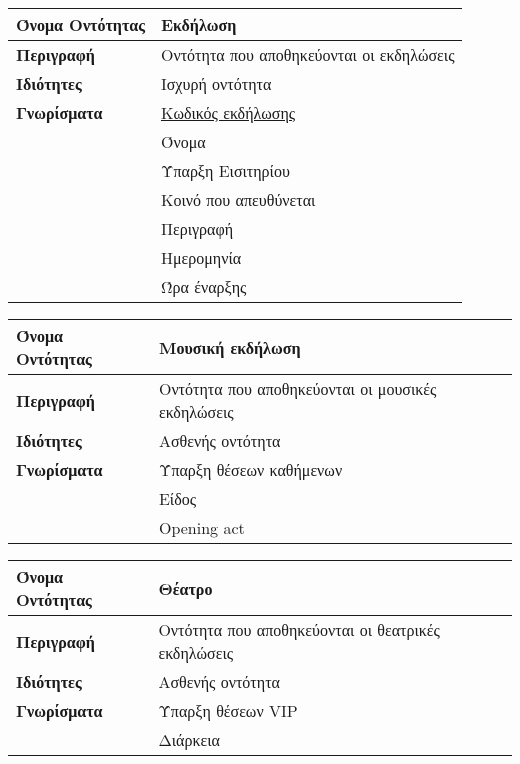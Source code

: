 \begin{center}
\begin{tabular}[]{|p{4cm}|p{10cm}|}
\hline
\textbf{Όνομα Οντότητας}   &  Εκδήλωση  \\ \hline 
\textbf{Περιγραφή}         &  Οντότητα που αποθηκεύονται οι εκδηλώσεις \\ \hline 
\textbf{Ιδιότητες}         &  Ισχυρή οντότητα \\  \hline               
\textbf{Γνωρίσματα}        &  \underline{Κωδικός εκδήλωσης} \\
                           &  Όνομα \\
            ~              &  Ύπαρξη Εισιτηρίου \\
             ~             &  Κοινό που απευθύνεται \\
              ~            &  Περιγραφή \\
                           &  Ημερομηνία \\
                           &  Ώρα έναρξης\\
 \hline
\end{tabular}
\vspace{0.3 cm}


\begin{tabular}[]{|p{4cm}|p{10cm}|}
 \hline
\textbf{Όνομα Οντότητας}   &  Μουσική εκδήλωση  \\ \hline 
\textbf{Περιγραφή}         &  Οντότητα που αποθηκεύονται οι μουσικές εκδηλώσεις \\ \hline 
\textbf{Ιδιότητες}         &  Ασθενής οντότητα \\  \hline               
\textbf{Γνωρίσματα}        &  Ύπαρξη θέσεων καθήμενων \\
                           &  Είδος \\
                           &  Opening act \\
 \hline
\end{tabular}
\vspace{0.3 cm}

\begin{tabular}[]{|p{4cm}|p{10cm}|}
\hline
\textbf{Όνομα Οντότητας}   &  Θέατρο \\ \hline 
\textbf{Περιγραφή}         &  Οντότητα που αποθηκεύονται οι θεατρικές εκδηλώσεις \\ \hline 
\textbf{Ιδιότητες}         &  Ασθενής οντότητα \\  \hline               
\textbf{Γνωρίσματα}        &  Ύπαρξη θέσεων VIP \\
                           &  Διάρκεια \\
\hline
\end{tabular}
\vspace{0.3 cm}


\end{center}
